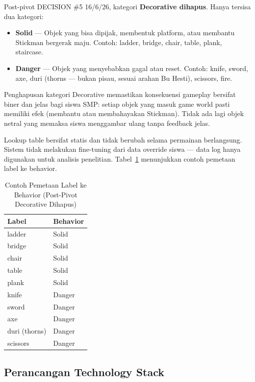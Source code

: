\documentclass[12pt,a4paper,oneside,openany]{report}
\begin{document}
Post-pivot DECISION \#5 16/6/26, kategori \textbf{Decorative dihapus}. Hanya tersisa dua kategori:

\begin{itemize}
    \item \textbf{Solid} --- Objek yang bisa dipijak, membentuk platform, atau membantu Stickman bergerak maju. Contoh: ladder, bridge, chair, table, plank, staircase.
    \item \textbf{Danger} --- Objek yang menyebabkan gagal atau reset. Contoh: knife, sword, axe, duri (thorns --- bukan pisau, sesuai arahan Bu Hesti), scissors, fire.
\end{itemize}

Penghapusan kategori Decorative memastikan konsekuensi gameplay bersifat biner dan jelas bagi siswa SMP: setiap objek yang masuk game world pasti memiliki efek (membantu atau membahayakan Stickman). Tidak ada lagi objek netral yang memaksa siswa menggambar ulang tanpa feedback jelas.

Lookup table bersifat statis dan tidak berubah selama permainan berlangsung. Sistem tidak melakukan fine-tuning dari data override siswa --- data log hanya digunakan untuk analisis penelitian. Tabel~\ref{tab:behavior-mapping} menunjukkan contoh pemetaan label ke behavior.

\begin{table}[H]
\centering
\caption{Contoh Pemetaan Label ke Behavior (Post-Pivot Decorative Dihapus)}
\label{tab:behavior-mapping}
\begin{tabular}{|l|l|}
\hline
\textbf{Label} & \textbf{Behavior} \\ \hline
ladder & Solid \\ \hline
bridge & Solid \\ \hline
chair & Solid \\ \hline
table & Solid \\ \hline
plank & Solid \\ \hline
knife & Danger \\ \hline
sword & Danger \\ \hline
axe & Danger \\ \hline
duri (thorns) & Danger \\ \hline
scissors & Danger \\ \hline
\end{tabular}
\end{table}

\subsection{Perancangan Technology Stack}
\label{subsec:tech-stack}
\end{document}
